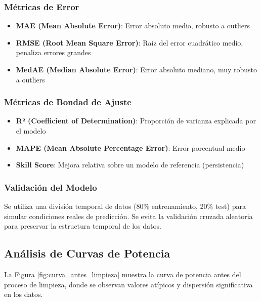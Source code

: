 \documentclass[conference]{IEEEtran}
\begin{document}
	\subsubsection{Métricas de Error}
	\begin{itemize}
		\item \textbf{MAE (Mean Absolute Error)}: Error absoluto medio, robusto a outliers
		\item \textbf{RMSE (Root Mean Square Error)}: Raíz del error cuadrático medio, penaliza errores grandes
		\item \textbf{MedAE (Median Absolute Error)}: Error absoluto mediano, muy robusto a outliers
	\end{itemize}
	
	\subsubsection{Métricas de Bondad de Ajuste}
	\begin{itemize}
		\item \textbf{R² (Coefficient of Determination)}: Proporción de varianza explicada por el modelo
		\item \textbf{MAPE (Mean Absolute Percentage Error)}: Error porcentual medio
		\item \textbf{Skill Score}: Mejora relativa sobre un modelo de referencia (persistencia)
	\end{itemize}
	
	\subsubsection{Validación del Modelo}
	Se utiliza una división temporal de datos (80\% entrenamiento, 20\% test) para simular condiciones reales de predicción. Se evita la validación cruzada aleatoria para preservar la estructura temporal de los datos.
	
	\subsection{Análisis de Curvas de Potencia}
	La Figura \ref{fig:curva_antes_limpieza} muestra la curva de potencia antes del proceso de limpieza, donde se observan valores atípicos y dispersión significativa en los datos.
	
\end{document}
